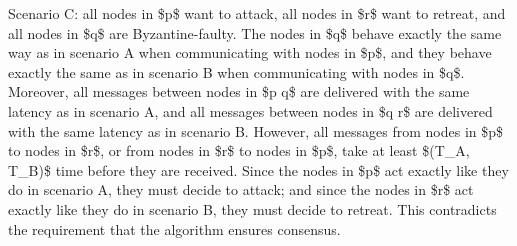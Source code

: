 \documentclass{article}
\begin{document}
Scenario C: all nodes in \$p\$ want to attack, all nodes in \$r\$ want to retreat, and all nodes in \$q\$ are Byzantine-faulty.
The nodes in \$q\$ behave exactly the same way as in scenario A when communicating with nodes in \$p\$, and they behave exactly the same as in scenario B when communicating with nodes in \$q\$.
Moreover, all messages between nodes in \$p \cup q\$ are delivered with the same latency as in scenario A, and all messages between nodes in \$q \cup r\$ are delivered with the same latency as in scenario B.
However, all messages from nodes in \$p\$ to nodes in \$r\$, or from nodes in \$r\$ to nodes in \$p\$, take at least \$\max(T_A, T_B)\$ time before they are received.
Since the nodes in \$p\$ act exactly like they do in scenario A, they must decide to attack; and since the nodes in \$r\$ act exactly like they do in scenario B, they must decide to retreat.
This contradicts the requirement that the algorithm ensures consensus.
\end{document}
